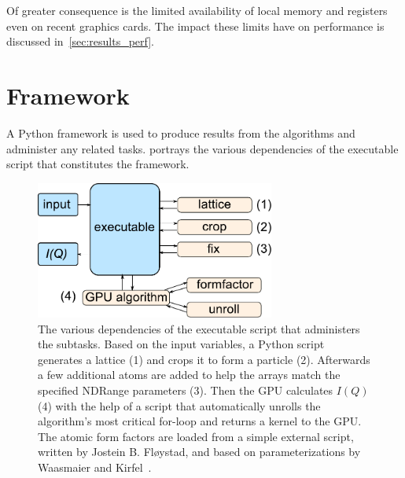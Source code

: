 \documentclass[11pt,twoside]{report}
\begin{document}
\indent Of greater consequence is the limited availability of local memory and registers even on recent graphics cards. The impact these limits have on performance is discussed in~\cref{sec:results_perf}.


\section{Framework\label{sec:framework}}
A Python framework is used to produce results from the algorithms and administer any related tasks.  portrays the various dependencies of the executable script that constitutes the framework.

\begin{figure}[htbp]
	\centering
		\includegraphics[width=0.7\textwidth]{img/framework.pdf}	
	\caption{The various dependencies of the executable script that administers the subtasks. Based on the input variables, a Python script generates a lattice (1) and crops it to form a particle (2). Afterwards a few additional atoms are added to help the arrays match the specified NDRange parameters (3). Then the GPU calculates $I(Q)$ (4) with the help of a script that automatically unrolls the algorithm's most critical for-loop and returns a kernel to the GPU. The atomic form factors are loaded from a simple external script, written by Jostein B. Fløystad, and based on parameterizations by Waasmaier and Kirfel~\cite{Waasmaier:sh0059}. \label{fig:framework}}
\end{figure}
\end{document}
